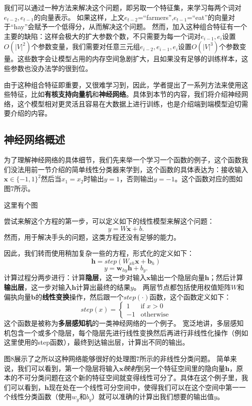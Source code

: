 \documentclass[10pt,a4paper]{ctexart}
\begin{document}
我们可以通过一种方法来解决这个问题，即另取一个特征集，来学习每两个词对$e_{t-2},e_{t-1}$的向量表示。
如果这样，上文$e_{t-2}$=“farmers”,$e_{t-1}$=“eat”的向量对于“hay”会赋予一个低得分，从而解决这个问题。
然而，加入这种组合特征有一个主要的缺陷：这样会极大的扩大参数个数，不只需要为每一个词对$e_{i-1},e_i$设置$O(|V|^2)$个参数变量，我们需要对任意三元组$e_{i-2},e_{i-1},e_i$设置$O(|V|^3)$个参数变量。这些数字会让模型占用的内存空间急剧扩大，且如果没有足够的训练样本，这些参数也没办法学的很到位。

由于这种组合特征即重要，又很难学习到，因此，学者提出了一系列方法来使用这些特征，比如\textbf{有核支持向量机}和\textbf{神经网络}。具体到本节的内容，我们将介绍神经网络，这个模型相对更灵活且容易在大数据上进行训练，也是介绍端到端模型迫切需要介绍的内容。

\subsection{神经网络概述}
为了理解神经网络的具体细节，我们先来举一个学习一个函数的例子，这个函数我们没法用前一节介绍的简单线性分类器来学到，这个函数的具体表达为：接收输入$\textbf{x} \in \{-1,1\}^2$然后当$x_1=x_2$时输出$y=1$，否则输出$y=-1$。这个函数对应的图如图7所示。

这里有个图

尝试来解这个方程的第一步，可以定义如下的线性模型来解这个问题：
\[
 y = W\textbf{x} + b.
\]
然而，用于解决手头的问题，这类方程还没有足够的能力。

因此，我们转而使用稍加复杂一些的方程，形式化的定义如下：
\[
 \textbf{h} = step(W_{xh}\textbf{x} + \textbf{b}_h)
\]
\[
 y = \textbf{w}_{hy}\textbf{h} + b_y.
\]
计算过程分两步进行：计算\textbf{隐层}，这一步对输入$\textbf{x}$输出一个隐层向量$\textbf{h}$；然后计算\textbf{输出层}，这一步对输入$\textbf{h}$计算出最终的结果$y$。
两层节点都包括使用权值矩阵$W$和偏执向量$\textbf{b}$的\textbf{线性变换}操作，然后跟一个$step(\cdot)$函数，这个函数定义如下：
\[
 step(x) = \left\{ \begin{array}{ll}
  1 & \textrm{if $x > 0$} \\
  -1 & \textrm{otherwise}
  \end{array} \right.
\]
这个函数是被称为\textbf{多层感知机}的一类神经网络的一个例子。
宽泛地讲，多层感知机包含一个或多个隐层，每个隐层先进行线性变换然后再进行非线性化操作（例如这里使用的step函数），最终到达输出层，计算出不同的输出。

图8展示了之所以这种网络能够很好的处理图7所示的非线性分类问题。
简单来说，我们可以看到，第一个隐层将输入$\textbf{x}$\textit{映射}到另一个特征空间里的隐向量$\textbf{h}$，原本的不可分类问题在这个新的特征空间就变得线性可分了。具体在这个例子里，我们可以看到，$\textbf{h}$现在处在一个线性可分空间中，使得我们可以在这个空间中第一一个线性分类函数（使用$w_y$和$b_y$）就可以准确的计算出我们想要的输出值$y$。
\end{document}
